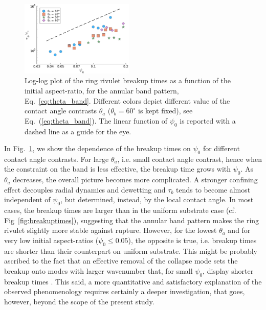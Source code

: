\documentclass[%
 aip,
 amsmath,amssymb,
 reprint,%
]{revtex4-1}
\begin{document}
\begin{figure}
    \centering
    \includegraphics[width=0.48\textwidth]{Figure_6.pdf}
    \caption{Log-log plot of the ring rivulet breakup times as a function of the initial aspect-ratio, for the annular band pattern, Eq.~\ref{eq:theta_band}.
    Different colors depict different value of the contact angle contrasts $\theta_a$ ($\theta_b = 60^{\circ}$ is kept fixed), see Eq.~(\ref{eq:theta_band}).
    The linear function of $\psi_0$ is reported with a dashed line as a guide for the eye.
    }
    \label{fig:bandBreakupT}
\end{figure}
In Fig.~\ref{fig:bandBreakupT}, we show the dependence of the breakup times on $\psi_0$ for different contact angle contrasts. 
For large $\theta_a$, i.e. small contact angle contrast, hence when the constraint on the band is less effective, the breakup time grows with $\psi_0$. 
As $\theta_a$ decreases, the overall picture becomes more complicated.
A stronger confining effect decouples radial dynamics and dewetting and $\tau_b$ tends to become almost independent of $\psi_0$, but determined, instead, by the local contact angle. 
In most cases, the breakup times are larger than in the uniform substrate case (cf. Fig~\ref{fig:breakuptimes}), suggesting that the annular band pattern makes the ring rivulet slightly more stable against rupture. 
However, for the lowest $\theta_a$ and for very low initial aspect-ratios ($\psi_0 \leq 0.05$), the opposite is true, i.e. breakup times are shorter than their counterpart on uniform substrate. 
This might be probably ascribed to the fact that an effective removal of the collapse mode sets the breakup onto modes with larger wavenumber that, for small $\psi_0$, display shorter breakup times \cite{gonzalezStabilityLiquidRing2013}. 
This said, a more quantitative and satisfactory explanation of the observed phenomenology requires certainly a deeper investigation, that goes, however, beyond the scope of the present study.
\end{document}
